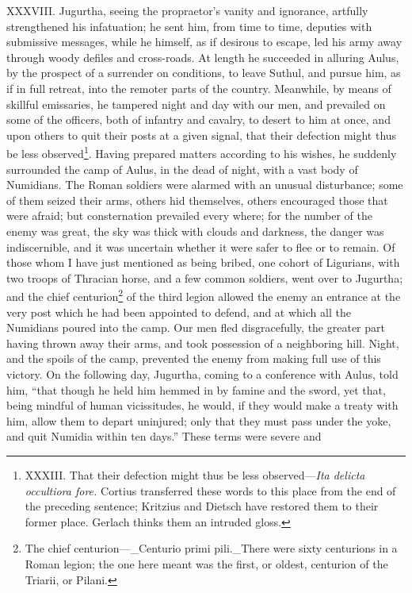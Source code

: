 XXXVIII. Jugurtha, seeing the propraetor's vanity and ignorance,
artfully strengthened his infatuation; he sent him, from time to time,
deputies with submissive messages, while he himself, as if desirous to
escape, led his army away through woody defiles and cross-roads. At
length he succeeded in alluring Aulus, by the prospect of a surrender
on conditions, to leave Suthul, and pursue him, as if in full retreat,
into the remoter parts of the country. Meanwhile, by means of skillful
emissaries, he tampered night and day with our men, and prevailed on
some of the officers, both of infantry and cavalry, to desert to him
at once, and upon others to quit their posts at a given signal, that
their defection might thus be less observed\footnote{XXXIII. That their defection might thus be less observed—\emph{Ita
delicta occultiora fore.} Cortius transferred these words to this place
from the end of the preceding sentence; Kritzius and Dietsch have
restored them to their former place. Gerlach thinks them an intruded
gloss.}. Having prepared
matters according to his wishes, he suddenly surrounded the camp of
Aulus, in the dead of night, with a vast body of Numidians. The Roman
soldiers were alarmed with an unusual disturbance; some of them seized
their arms, others hid themselves, others encouraged those that were
afraid; but consternation prevailed every where; for the number of the
enemy was great, the sky was thick with clouds and darkness, the
danger was indiscernible, and it was uncertain whether it were safer
to flee or to remain. Of those whom I have just mentioned as being
bribed, one cohort of Ligurians, with two troops of Thracian horse,
and a few common soldiers, went over to Jugurtha; and the chief
centurion\footnote{The chief centurion—\_Centurio primi pili.\_There were sixty
centurions in a Roman legion; the one here meant was the first, or
oldest, centurion of the Triarii, or Pilani.} of the third legion allowed the enemy an entrance at
the very post which he had been appointed to defend, and at which all
the Numidians poured into the camp. Our men fled disgracefully, the
greater part having thrown away their arms, and took possession of a
neighboring hill. Night, and the spoils of the camp, prevented the
enemy from making full use of this victory. On the following day,
Jugurtha, coming to a conference with Aulus, told him, ``that though he
held him hemmed in by famine and the sword, yet that, being mindful of
human vicissitudes, he would, if they would make a treaty with him,
allow them to depart uninjured; only that they must pass under the
yoke, and quit Numidia within ten days.'' These terms were severe and
